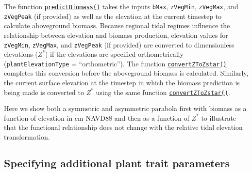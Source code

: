 The function
\protect\hyperlink{predictbiomass}{\texttt{predictBiomass()}} takes the
inputs \texttt{bMax}, \texttt{zVegMin}, \texttt{zVegMax}, and
\texttt{zVegPeak} (if provided) as well as the elevation at the current
timestep to calculate aboveground biomass. Because regional tidal
regimes influence the relationship between elevation and biomass
production, elevation values for \texttt{zVegMin}, \texttt{zVegMax}, and
\texttt{zVegPeak} (if provided) are converted to dimensionless
elevations (\(Z^*\)) if the elevations are specified orthometrically
(\texttt{plantElevationType} = ``orthometric''). The function
\protect\hyperlink{convertztozstar}{\texttt{convertZToZstar()}}
completes this conversion before the aboveground biomass is calculated.
Similarly, the current surface elevation at the timestep in which the
biomass prediction is being made is converted to \(Z^*\) using the same
function
\protect\hyperlink{convertztozstar}{\texttt{convertZToZstar()}}.

Here we show both a symmetric and asymmetric parabola first with biomass
as a function of elevation in cm NAVD88 and then as a function of
\(Z^*\) to illustrate that the functional relationship does not change
with the relative tidal elevation transformation.

\hypertarget{specifying-additional-plant-trait-parameters}{%
\subsection{Specifying additional plant trait
parameters}\label{specifying-additional-plant-trait-parameters}}

